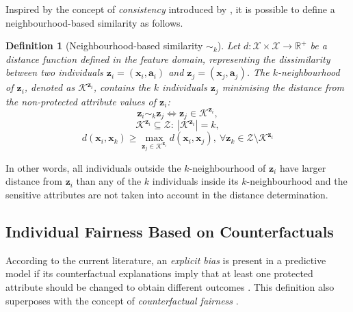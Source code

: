 \documentclass[letterpaper]{article} %
\newtheorem{definition}{Definition}
\begin{document}
Inspired by the concept of \emph{consistency} introduced by \cite{ZemelWSPD13}, it is possible to define a neighbourhood-based similarity as follows.
%
\begin{definition}[Neighbourhood-based similarity $\sim_k$]\label{similar_individuals_neigh}
	Let $d: \mathcal{X} \times \mathcal{X} \rightarrow \mathbb{R}^{+}$ be a distance function defined in the feature domain, representing the dissimilarity between two individuals $\boldsymbol{z}_i = (\boldsymbol{x}_i, \boldsymbol{a}_i)$ and $\boldsymbol{z}_j = (\boldsymbol{x}_j, \boldsymbol{a}_j)$.
	The $k$-neighbourhood of $\boldsymbol{z}_i$, denoted as $\mathcal{K}^{\boldsymbol{z}_i}$, contains the $k$ individuals $\boldsymbol{z}_j$ minimising the distance from the non-protected attribute values of $\boldsymbol{z}_i$:
	$$ \boldsymbol{z}_i \sim_k \boldsymbol{z}_j \iff \boldsymbol{z}_j \in \mathcal{K}^{\boldsymbol{z}_i}, $$
	$$\mathcal{K}^{\boldsymbol{z}_i} \subseteq \mathcal{Z} : ~ | \mathcal{K}^{\boldsymbol{z}_i} | = k,$$
	$$d(\boldsymbol{x}_i, \boldsymbol{x}_k) \geq \underset{\boldsymbol{z}_j \in \mathcal{K}^{\boldsymbol{z}_i}}{\max} d(\boldsymbol{x}_i, \boldsymbol{x}_j), ~ \forall \boldsymbol{z}_k \in \mathcal{Z} \setminus \mathcal{K}^{\boldsymbol{z}_i}$$ %
\end{definition}
%
\noindent In other words, all individuals outside the $k$-neighbourhood of $\boldsymbol{z}_i$ have larger distance from $\boldsymbol{z}_i$ than any of the $k$ individuals inside its $k$-neighbourhood and the sensitive attributes are not taken into account in the distance determination.

\subsection{Individual Fairness Based on Counterfactuals}

According to the current literature, an \emph{explicit bias} is present in a predictive model if its counterfactual explanations imply that at least one protected attribute should be changed to obtain different outcomes \cite{sokol2022fat}. This definition also superposes with the concept of \emph{counterfactual fairness} \cite{NIPS2017_a486cd07}.
\end{document}
